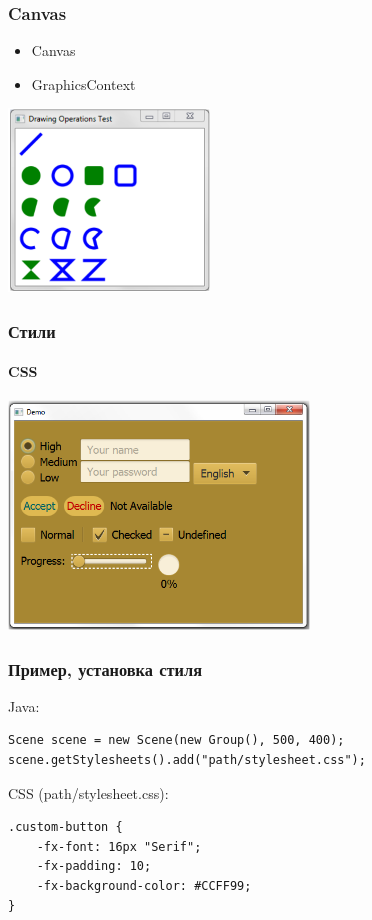 \documentclass[xetex,mathserif,serif]{beamer}
\begin{document}
	\begin{frame}
		\frametitle{Canvas}
		\begin{itemize}
			\item Canvas
			\item GraphicsContext
		\end{itemize}
		\begin{center}
			\includegraphics[width=0.4\textwidth]{canvas.png}
		\end{center}
	\end{frame}

	\begin{frame}
		\frametitle{Стили}
		\framesubtitle{CSS}
		\begin{center}
			\includegraphics[width=0.6\textwidth]{styles.png}
		\end{center}
	\end{frame}

	\begin{frame}[fragile]
		\frametitle{Пример, установка стиля}
		Java:
		\begin{verbatim}
Scene scene = new Scene(new Group(), 500, 400);
scene.getStylesheets().add("path/stylesheet.css");
		\end{verbatim}
		\vspace{1cm}
		CSS (path/stylesheet.css):
		\begin{verbatim}
.custom-button {
    -fx-font: 16px "Serif";
    -fx-padding: 10;
    -fx-background-color: #CCFF99;
}
		\end{verbatim}
	\end{frame}
\end{document}

